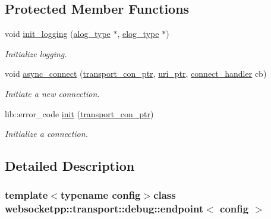 \subsection*{Protected Member Functions}
\begin{DoxyCompactItemize}
\item 
void \hyperlink{classwebsocketpp_1_1transport_1_1debug_1_1endpoint_a548d0865fa00469d9ab78daa9ad25c3a}{init\+\_\+logging} (\hyperlink{classwebsocketpp_1_1transport_1_1debug_1_1endpoint_ab2b8a06c2ba2a9ae26def00aefcbc930}{alog\+\_\+type} $\ast$, \hyperlink{classwebsocketpp_1_1transport_1_1debug_1_1endpoint_a3616bf82ba2a1026fad9de8145bd9375}{elog\+\_\+type} $\ast$)
\begin{DoxyCompactList}\small\item\em Initialize logging. \end{DoxyCompactList}\item 
void \hyperlink{classwebsocketpp_1_1transport_1_1debug_1_1endpoint_a8b5c3265ebf3bf68af57f2d770950edb}{async\+\_\+connect} (\hyperlink{classwebsocketpp_1_1transport_1_1debug_1_1endpoint_ab261a090fca072aea9b5dba04aba4c6d}{transport\+\_\+con\+\_\+ptr}, \hyperlink{namespacewebsocketpp_aae370ea5ac83a8ece7712cb39fc23f5b}{uri\+\_\+ptr}, \hyperlink{namespacewebsocketpp_1_1transport_ac392fca34e946b48414278c0c3addfa5}{connect\+\_\+handler} cb)
\begin{DoxyCompactList}\small\item\em Initiate a new connection. \end{DoxyCompactList}\item 
lib\+::error\+\_\+code \hyperlink{classwebsocketpp_1_1transport_1_1debug_1_1endpoint_a23affe0618e70a665369fe273f2b534b}{init} (\hyperlink{classwebsocketpp_1_1transport_1_1debug_1_1endpoint_ab261a090fca072aea9b5dba04aba4c6d}{transport\+\_\+con\+\_\+ptr})
\begin{DoxyCompactList}\small\item\em Initialize a connection. \end{DoxyCompactList}\end{DoxyCompactItemize}


\subsection{Detailed Description}
\subsubsection*{template$<$typename config$>$class websocketpp\+::transport\+::debug\+::endpoint$<$ config $>$}



